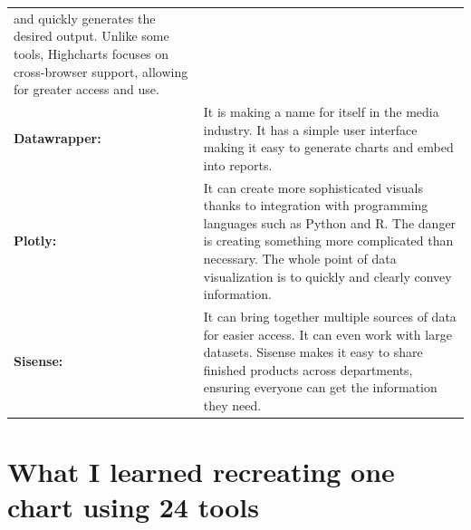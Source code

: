 \documentclass[]{book}
\theoremstyle{definition}
\theoremstyle{definition}
\theoremstyle{definition}
\theoremstyle{remark}
\begin{document}
\begin{longtable}[]{@{}ll@{}}
\begin{minipage}[t]{0.78\columnwidth}
and quickly generates the desired output. Unlike some tools, Highcharts
focuses on cross-browser support, allowing for greater access and
use.\strut
\end{minipage}\tabularnewline
\begin{minipage}[t]{0.16\columnwidth}\raggedright\strut
\textbf{Datawrapper:}\strut
\end{minipage} & \begin{minipage}[t]{0.78\columnwidth}\raggedright\strut
It is making a name for itself in the media industry. It has a simple
user interface making it easy to generate charts and embed into
reports.\strut
\end{minipage}\tabularnewline
\begin{minipage}[t]{0.16\columnwidth}\raggedright\strut
\textbf{Plotly:}\strut
\end{minipage} & \begin{minipage}[t]{0.78\columnwidth}\raggedright\strut
It can create more sophisticated visuals thanks to integration with
programming languages such as Python and R. The danger is creating
something more complicated than necessary. The whole point of data
visualization is to quickly and clearly convey information.\strut
\end{minipage}\tabularnewline
\begin{minipage}[t]{0.16\columnwidth}\raggedright\strut
\textbf{Sisense:}\strut
\end{minipage} & \begin{minipage}[t]{0.78\columnwidth}\raggedright\strut
It can bring together multiple sources of data for easier access. It can
even work with large datasets. Sisense makes it easy to share finished
products across departments, ensuring everyone can get the information
they need.\strut
\end{minipage}\tabularnewline
\bottomrule
\end{longtable}

\section{What I learned recreating one chart using 24
tools}\label{what-i-learned-recreating-one-chart-using-24-tools}
\end{document}
